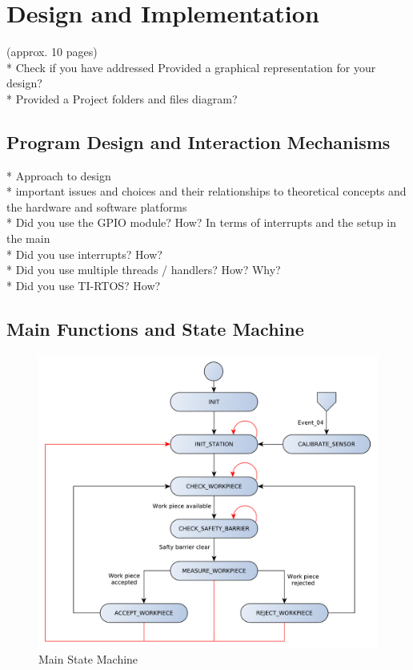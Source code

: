 \chapter{Design and Implementation}

(approx. 10 pages)\\

* Check if you have addressed Provided a graphical representation for your design?\\
* Provided a Project folders and files diagram?\\

\section{Program Design and Interaction Mechanisms} %
* Approach to design\\
* important issues and choices and their relationships to theoretical concepts and the hardware and software platforms\\
* Did you use the GPIO module? How? In terms of interrupts and the setup in the main\\
* Did you use interrupts? How?\\ 
* Did you use multiple threads / handlers? How? Why?\\
* Did you use TI-RTOS? How?\\

\section{Main Functions and State Machine} %

\begin{figure}[H]
	\begin{center}
		\includegraphics[scale=.60]{media/StateMachine_Main.pdf} 	
		\caption{Main State Machine}
		\label{fig:statemachine}
	\end{center}
\end{figure}

